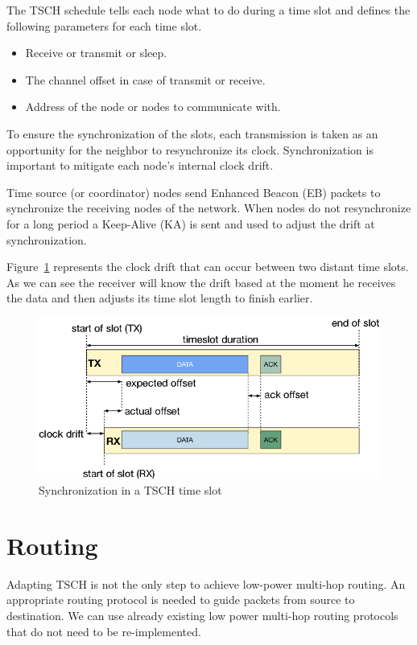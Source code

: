 The TSCH schedule tells each node what to do during a time slot and defines the
following parameters for each time slot.

\begin{itemize}
  \item Receive or transmit or sleep.
  \item The channel offset in case of transmit or receive.
  \item Address of the node or nodes to communicate with.
\end{itemize}

To ensure the synchronization of the slots, each transmission is taken as an opportunity
for the neighbor to resynchronize its clock.
Synchronization is important to mitigate each node's internal clock drift.

Time source (or coordinator) nodes send Enhanced Beacon (EB) packets to synchronize the receiving
nodes of the network. When nodes do not resynchronize for a long period
a Keep-Alive (KA) is sent and used to adjust the drift at synchronization.

Figure~\ref{fig:sync} represents the clock drift that can occur between two
distant time slots.
As we can see the receiver will know the drift based at the moment he receives
the data and then adjusts its time slot length to finish earlier.

\begin{figure}[H]
  \centering
  \includegraphics[width=\textwidth]{thesis.tex/chapters/context/fig/sync.png}
  \caption{Synchronization in a TSCH time slot\cite{TELESHERMETO201784}\label{fig:sync}}
\end{figure}

\section{Routing}

Adapting TSCH is not the only step to achieve low-power
multi-hop routing.
An appropriate routing protocol is needed to guide packets from source to destination.
We can use already existing low power multi-hop routing protocols that do not need
to be re-implemented.

